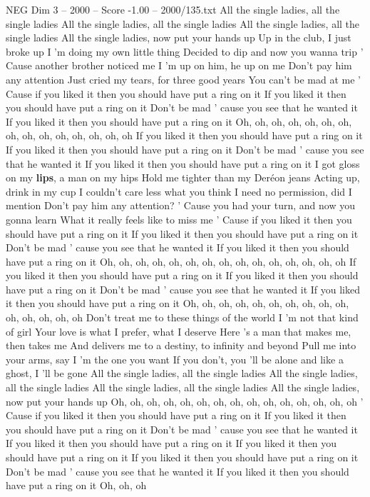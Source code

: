 \begin{textsample}{NEG Dim 3 – 2000 – Score -1.00 – 2000/135.txt}  \label{ex:f3_neg_018}
All the single ladies, all the single ladies All the single ladies, all the single ladies All the single ladies, all the single ladies All the single ladies, now put your hands up Up in the club, I just broke up I 'm doing my own little thing Decided to dip and now you wanna trip ' Cause another brother noticed me I 'm up on him, he up on me Don't pay him any attention Just cried my tears, for three good years You can't be mad at me ' Cause if you liked it then you should have put a ring on it If you liked it then you should have put a ring on it Don't be mad ' cause you see that he wanted it If you liked it then you should have put a ring on it Oh, oh, oh, oh, oh, oh, oh, oh, oh, oh, oh, oh, oh, oh, oh If you liked it then you should have put a ring on it If you liked it then you should have put a ring on it Don't be mad ' cause you see that he wanted it If you liked it then you should have put a ring on it I got gloss on my \textbf{lips}, a man on my hips Hold me tighter than my Deréon jeans Acting up, drink in my cup I couldn't care less what you think I need no permission, did I mention Don't pay him any attention? ' Cause you had your turn, and now you gonna learn What it really feels like to miss me ' Cause if you liked it then you should have put a ring on it If you liked it then you should have put a ring on it Don't be mad ' cause you see that he wanted it If you liked it then you should have put a ring on it Oh, oh, oh, oh, oh, oh, oh, oh, oh, oh, oh, oh, oh, oh, oh If you liked it then you should have put a ring on it If you liked it then you should have put a ring on it Don't be mad ' cause you see that he wanted it If you liked it then you should have put a ring on it Oh, oh, oh, oh, oh, oh, oh, oh, oh, oh, oh, oh, oh, oh, oh Don't treat me to these things of the world I 'm not that kind of girl Your love is what I prefer, what I deserve Here 's a man that makes me, then takes me And delivers me to a destiny, to infinity and beyond Pull me into your arms, say I 'm the one you want If you don't, you 'll be alone and like a ghost, I 'll be gone All the single ladies, all the single ladies All the single ladies, all the single ladies All the single ladies, all the single ladies All the single ladies, now put your hands up Oh, oh, oh, oh, oh, oh, oh, oh, oh, oh, oh, oh, oh, oh, oh ' Cause if you liked it then you should have put a ring on it If you liked it then you should have put a ring on it Don't be mad ' cause you see that he wanted it If you liked it then you should have put a ring on it If you liked it then you should have put a ring on it If you liked it then you should have put a ring on it Don't be mad ' cause you see that he wanted it If you liked it then you should have put a ring on it Oh, oh, oh

\end{textsample}
